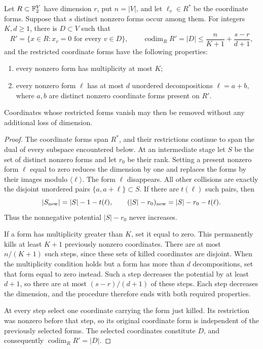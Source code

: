 \begin{lemma}
\label{p1:arith:coordinate-regularisation}
Let \(R\subset\mathbb F_2^V\) have dimension \(r\), put \(n=|V|\), and let
\(\ell_v\in R^*\) be the coordinate forms.  Suppose that \(s\) distinct
nonzero forms occur among them.  For integers \(K,d\geq1\), there is
\(D\subset V\) such that
\[
 R'=\{x\in R:x_v=0\text{ for every }v\in D\},\qquad
 \operatorname{codim}_R R'=|D|
 \leq\frac{n}{K+1}+\frac{s-r}{d+1},
\]
and the restricted coordinate forms have the following properties:
\begin{enumerate}
 \item every nonzero form has multiplicity at most \(K\);
 \item every nonzero form \(\ell\) has at most \(d\) unordered
 decompositions \(\ell=a+b\), where \(a,b\) are distinct nonzero
 coordinate forms present on \(R'\).
\end{enumerate}
Coordinates whose restricted forms vanish may then be removed without
any additional loss of dimension.
\end{lemma}

\begin{proof}
The coordinate forms span \(R^*\), and their restrictions continue to
span the dual of every subspace encountered below.
At an intermediate stage let \(S\) be the set of distinct nonzero forms
and let \(r_0\) be their rank.  Setting a present nonzero form \(\ell\)
equal to zero reduces the dimension by one and replaces the forms by
their images modulo \(\langle\ell\rangle\).
The form \(\ell\) disappears.  All other collisions are exactly the
disjoint unordered pairs \(\{a,a+\ell\}\subset S\).
If there are \(t(\ell)\) such pairs, then
\[
 |S_{\rm new}|=|S|-1-t(\ell),\qquad
 (|S|-r_0)_{\rm new}=|S|-r_0-t(\ell).
\]
Thus the nonnegative potential \(|S|-r_0\) never increases.

If a form has multiplicity greater than \(K\), set it equal to zero.
This permanently kills at least \(K+1\) previously nonzero coordinates.
There are at most \(n/(K+1)\) such steps, since these sets of killed
coordinates are disjoint.
When the multiplicity condition holds but a form has more than \(d\)
decompositions, set that form equal to zero instead.
Such a step decreases the potential by at least \(d+1\), so there are
at most \((s-r)/(d+1)\) of these steps.
Each step decreases the dimension, and the procedure therefore ends
with both required properties.

At every step select one coordinate carrying the form just killed.
Its restriction was nonzero before that step, so its original coordinate
form is independent of the previously selected forms.
The selected coordinates constitute \(D\), and consequently
\(\operatorname{codim}_R R'=|D|\).
\end{proof}

